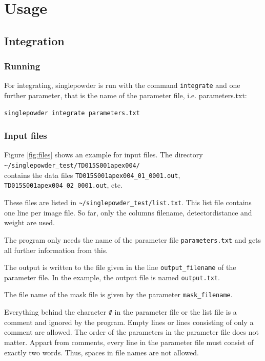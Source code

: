 \documentclass[a4paper, 12pt, twoside]{scrartcl}
\begin{document}
\section{Usage}

\subsection{Integration}
\subsubsection{Running}

For integrating, singlepowder is run with the command \verb|integrate| and one further parameter, that is the name of the parameter file, i.e. parameters.txt:\\
\begin{verbatim}
singlepowder integrate parameters.txt
\end{verbatim}

\subsubsection{Input files}

Figure \ref{fig:files} shows an example for input files. The directory \\
\verb|~/singlepowder_test/TD015S001apex004/|\\
contains the data files \verb|TD015S001apex004_01_0001.out|, \verb|TD015S001apex004_02_0001.out|, etc.

These files are listed in \verb|~/singlepowder_test/list.txt|. This list file contains one line per image file. So far, only the columns filename, detectordistance and weight are used.

The program only needs the name of the parameter file \verb|parameters.txt| and gets all further information from this.

The output is written to the file given in the line \verb|output_filename| of the parameter file. In the example, the output file is named \verb|output.txt|.

The file name of the mask file is given by the parameter \verb|mask_filename|.

Everything behind the character \verb|#| in the parameter file or the list file is a comment and ignored by the program. Empty lines or lines consisting of only a comment are allowed. The order of the parameters in the parameter file does not matter. Appart from comments, every line in the parameter file must consist of exactly two words. Thus, spaces in file names are not allowed.
\end{document}
